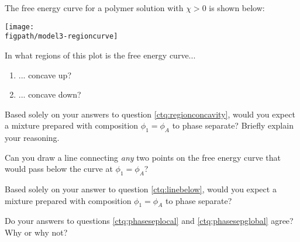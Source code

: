 \begin{activity}
\begin{ctqs}
					\begin{solution}[3in]
					\end{solution}
					
\end{ctqs}

\clearpage
\begin{model}

The free energy curve for a polymer solution with $\chi > 0$ is shown below:

\centerline{\texttt{[image: \\figpath/model3-regioncurve]}}

\end{model}

\begin{ctqs}

		\question \label{ctq:regionconcavity} In what regions of this plot is the free energy curve...
			\begin{enumerate}
				\item ... concave up?
					
					\begin{solution}[0.75in]
					\end{solution}
				\item ... concave down?
					
					\begin{solution}[0.75in]
					\end{solution}
			\end{enumerate}
			
		\question \label{ctq:phaseseplocal} Based solely on your answers to question \ref{ctq:regionconcavity}, would you expect a mixture prepared with composition $\phi_1 = \phi_A$ to phase separate?  Briefly explain your reasoning.
					
					\begin{solution}[1.75in]
					\end{solution}
		
		\question \label{ctq:linebelow} Can you draw a line connecting \emph{any} two points on the free energy curve that would pass below the curve at $\phi_1=\phi_A$?
		
		\question \label{ctq:phasesepglobal} Based solely on your answer to question \ref{ctq:linebelow}, would you expect a mixture prepared with composition $\phi_1 = \phi_A$ to phase separate?
		
		\question Do your answers to questions \ref{ctq:phaseseplocal} and \ref{ctq:phasesepglobal} agree?  Why or why not?
			

\end{ctqs}
\end{activity}
